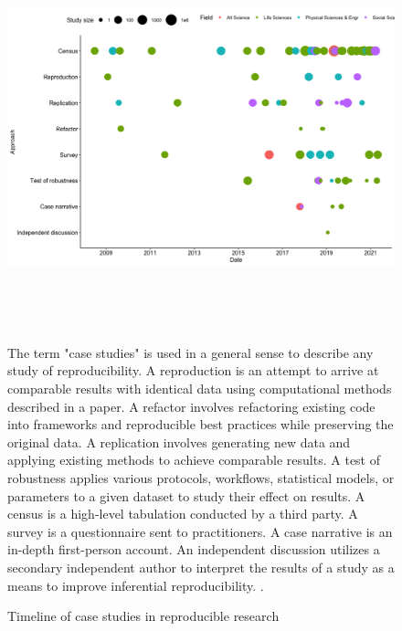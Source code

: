 \documentclass{drexelthesis}
\begin{document}
\begin{figure}[h!]
	\centering
	\includegraphics[width=\textwidth,height=11.04cm]{./images/casestudies.png}
	\caption{Timeline of case studies in reproducible research}
	\medskip
    \small
	The term "case studies" is used in a general sense to describe any study of reproducibility. A reproduction is an attempt to arrive at comparable results with identical data using computational methods described in a paper. A refactor involves refactoring existing code into frameworks and reproducible best practices while preserving the original data. A replication involves generating new data and applying existing methods to achieve comparable results. A test of robustness applies various protocols, workflows, statistical models, or parameters to a given dataset to study their effect on results. A census is a high-level tabulation conducted by a third party. A survey is a questionnaire sent to practitioners. A case narrative is an in-depth first-person account. An independent discussion utilizes a secondary independent author to interpret the results of a study as a means to improve inferential reproducibility. \cite{Leipzig2019-am}.
	\label{casestudies}
\end{figure}
\end{document}
